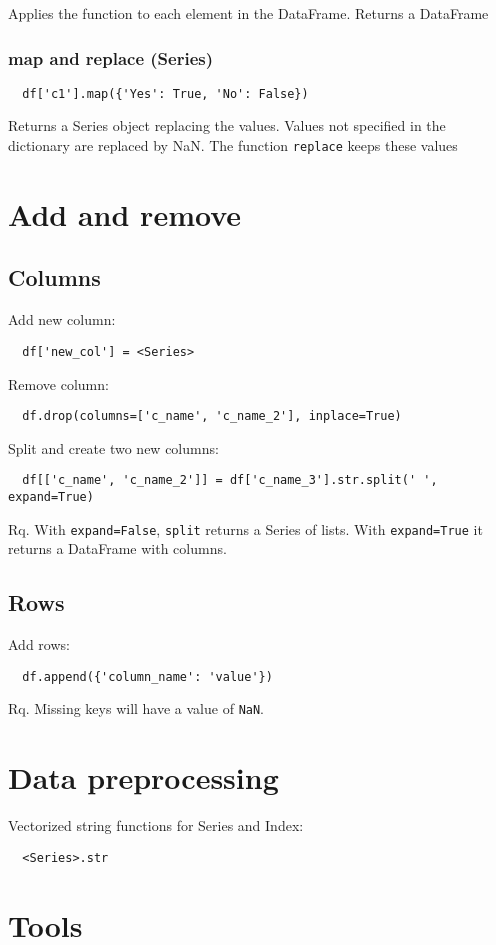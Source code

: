 \documentclass[french]{article}
\begin{document}
Applies the function to each element in the DataFrame. Returns a DataFrame

\subsubsection{map and replace (Series)}
\begin{verbatim}
  df['c1'].map({'Yes': True, 'No': False})
\end{verbatim}
Returns a Series object replacing the values. Values not specified in the dictionary are replaced by NaN. The function \verb|replace| keeps these values

\section{Add and remove}

\subsection{Columns}

Add new column:
\begin{verbatim}
  df['new_col'] = <Series>
\end{verbatim}

Remove column:
\begin{verbatim}
  df.drop(columns=['c_name', 'c_name_2'], inplace=True)
\end{verbatim}

Split and create two new columns:
\begin{verbatim}
  df[['c_name', 'c_name_2']] = df['c_name_3'].str.split(' ', expand=True)
\end{verbatim}
Rq. With \verb|expand=False|, \verb|split| returns a Series of lists. With \verb|expand=True| it returns a DataFrame with columns.

\subsection{Rows}

Add rows:
\begin{verbatim}
  df.append({'column_name': 'value'})
\end{verbatim}
Rq. Missing keys will have a value of \verb|NaN|.


\section{Data preprocessing}

Vectorized string functions for Series and Index:
\begin{verbatim}
  <Series>.str
\end{verbatim}

\section{Tools}
\end{document}
